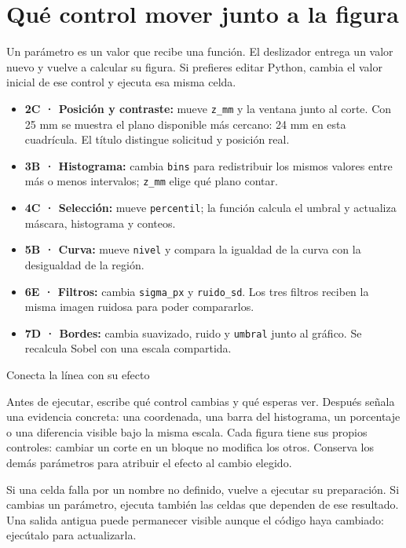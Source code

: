 \section{Qué control mover junto a la figura}

Un parámetro es un valor que recibe una función. El deslizador entrega un valor nuevo y vuelve a calcular su figura. Si prefieres editar Python, cambia el valor inicial de ese control y ejecuta esa misma celda.


\begin{itemize}
\item \textbf{2C · Posición y contraste:} mueve \texttt{z\_mm} y la ventana junto al corte. Con 25 mm se muestra el plano disponible más cercano: 24 mm en esta cuadrícula. El título distingue solicitud y posición real.
\item \textbf{3B · Histograma:} cambia \texttt{bins} para redistribuir los mismos valores entre más o menos intervalos; \texttt{z\_mm} elige qué plano contar.
\item \textbf{4C · Selección:} mueve \texttt{percentil}; la función calcula el umbral y actualiza máscara, histograma y conteos.
\item \textbf{5B · Curva:} mueve \texttt{nivel} y compara la igualdad de la curva con la desigualdad de la región.
\item \textbf{6E · Filtros:} cambia \texttt{sigma\_px} y \texttt{ruido\_sd}. Los tres filtros reciben la misma imagen ruidosa para poder compararlos.
\item \textbf{7D · Bordes:} cambia suavizado, ruido y \texttt{umbral} junto al gráfico. Se recalcula Sobel con una escala compartida.
\end{itemize}


\begin{Idea}{Conecta la línea con su efecto}

Antes de ejecutar, escribe qué control cambias y qué esperas ver. Después señala una evidencia concreta: una coordenada, una barra del histograma, un porcentaje o una diferencia visible bajo la misma escala. Cada figura tiene sus propios controles: cambiar un corte en un bloque no modifica los otros. Conserva los demás parámetros para atribuir el efecto al cambio elegido.


\end{Idea}

Si una celda falla por un nombre no definido, vuelve a ejecutar su preparación. Si cambias un parámetro, ejecuta también las celdas que dependen de ese resultado. Una salida antigua puede permanecer visible aunque el código haya cambiado: ejecútalo para actualizarla.

